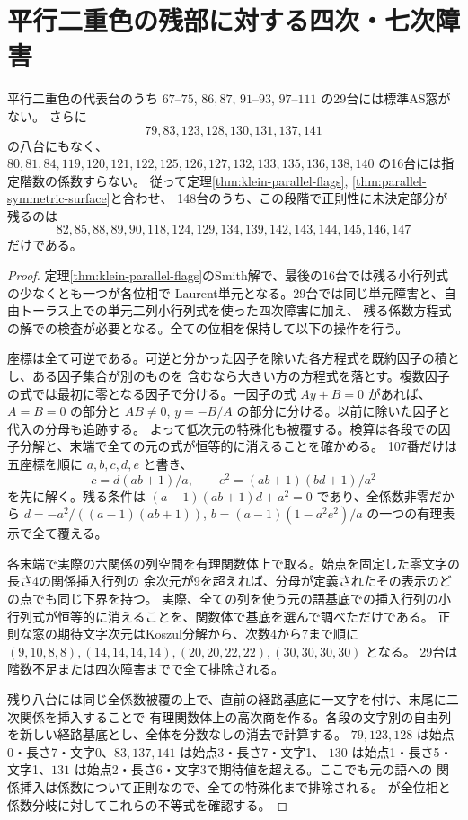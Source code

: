 \section{平行二重色の残部に対する四次・七次障害}
\label{sec:parallel-excluded-shapes}
\begin{theorem}
平行二重色の代表台のうち $67$--$75$, $86,87$, $91$--$93$, $97$--$111$ の29台には標準AS窓がない。
さらに
\[
 79,83,123,128,130,131,137,141
\]
の八台にもなく、
$80,81,84,119,120,121,122,125,126,127,132,133,135,136,138,140$ の16台には指定階数の係数すらない。
従って定理\ref{thm:klein-parallel-flags}, \ref{thm:parallel-symmetric-surface}と合わせ、
148台のうち、この段階で正則性に未決定部分が残るのは
\[
 82,85,88,89,90,118,124,129,134,139,142,143,144,145,146,147
\]
だけである。
\end{theorem}
\begin{proof}
定理\ref{thm:klein-parallel-flags}のSmith解で、最後の16台では残る小行列式の少なくとも一つが各位相で
Laurent単元となる。29台では同じ単元障害と、自由トーラス上での単元二列小行列式を使った四次障害に加え、
残る係数方程式の解での検査が必要となる。全ての位相を保持して以下の操作を行う。

座標は全て可逆である。可逆と分かった因子を除いた各方程式を既約因子の積とし、ある因子集合が別のものを
含むなら大きい方の方程式を落とす。複数因子の式では最初に零となる因子で分ける。一因子の式 $Ay+B=0$ があれば、
$A=B=0$ の部分と $AB\ne0$, $y=-B/A$ の部分に分ける。以前に除いた因子と代入の分母も追跡する。
よって低次元の特殊化も被覆する。検算は各段での因子分解と、末端で全ての元の式が恒等的に消えることを確かめる。
107番だけは五座標を順に $a,b,c,d,e$ と書き、
\[
 c=d(ab+1)/a,\qquad e^2=(ab+1)(bd+1)/a^2
\]
を先に解く。残る条件は $(a-1)(ab+1)d+a^2=0$ であり、全係数非零だから
$d=-a^2/((a-1)(ab+1))$, $b=(a-1)(1-a^2e^2)/a$ の一つの有理表示で全て覆える。

各末端で実際の六関係の列空間を有理関数体上で取る。始点を固定した零文字の長さ4の関係挿入行列の
余次元が9を超えれば、分母が定義されたその表示のどの点でも同じ下界を持つ。
実際、全ての列を使う元の語基底での挿入行列の小行列式が恒等的に消えることを、関数体で基底を選んで調べただけである。
正則な窓の期待文字次元はKoszul分解から、次数4から7まで順に
$(9,10,8,8),(14,14,14,14),(20,20,22,22),(30,30,30,30)$ となる。
29台は階数不足または四次障害までで全て排除される。

残り八台には同じ全係数被覆の上で、直前の経路基底に一文字を付け、末尾に二次関係を挿入することで
有理関数体上の高次商を作る。各段の文字別の自由列を新しい経路基底とし、全体を分数なしの消去で計算する。
$79,123,128$ は始点0・長さ7・文字0、$83,137,141$ は始点3・長さ7・文字1、
$130$ は始点1・長さ5・文字1、$131$ は始点2・長さ6・文字3で期待値を超える。ここでも元の語への
関係挿入は係数について正則なので、全ての特殊化まで排除される。
 が全位相と係数分岐に対してこれらの不等式を確認する。
\end{proof}


